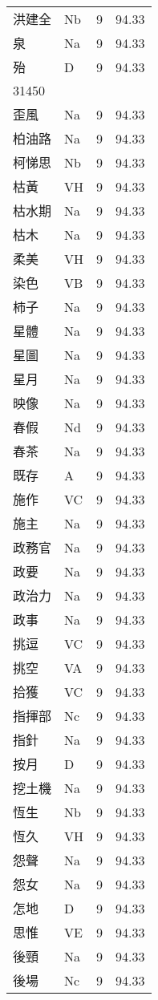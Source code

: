 \documentclass[twocolumn]{book}
\begin{document}
\begin{supertabular}{llrr}
洪建全 & Nb & 9 &  94.33\\
泉 & Na & 9 &  94.33\\
殆 & D & 9 &  94.33\\
31450\\
歪風 & Na & 9 &  94.33\\
柏油路 & Na & 9 &  94.33\\
柯悌思 & Nb & 9 &  94.33\\
枯黃 & VH & 9 &  94.33\\
枯水期 & Na & 9 &  94.33\\
枯木 & Na & 9 &  94.33\\
柔美 & VH & 9 &  94.33\\
染色 & VB & 9 &  94.33\\
柿子 & Na & 9 &  94.33\\
星體 & Na & 9 &  94.33\\
星圖 & Na & 9 &  94.33\\
星月 & Na & 9 &  94.33\\
映像 & Na & 9 &  94.33\\
春假 & Nd & 9 &  94.33\\
春茶 & Na & 9 &  94.33\\
既存 & A & 9 &  94.33\\
施作 & VC & 9 &  94.33\\
施主 & Na & 9 &  94.33\\
政務官 & Na & 9 &  94.33\\
政要 & Na & 9 &  94.33\\
政治力 & Na & 9 &  94.33\\
政事 & Na & 9 &  94.33\\
挑逗 & VC & 9 &  94.33\\
挑空 & VA & 9 &  94.33\\
拾獲 & VC & 9 &  94.33\\
指揮部 & Nc & 9 &  94.33\\
指針 & Na & 9 &  94.33\\
按月 & D & 9 &  94.33\\
挖土機 & Na & 9 &  94.33\\
恆生 & Nb & 9 &  94.33\\
恆久 & VH & 9 &  94.33\\
怨聲 & Na & 9 &  94.33\\
怨女 & Na & 9 &  94.33\\
怎地 & D & 9 &  94.33\\
思惟 & VE & 9 &  94.33\\
後頸 & Na & 9 &  94.33\\
後場 & Nc & 9 &  94.33\\

\end{supertabular}
\end{document}
